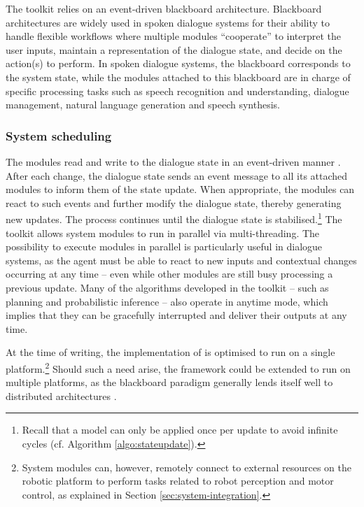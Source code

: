 The \opendial{} toolkit relies on an event-driven blackboard architecture. Blackboard architectures are widely used in spoken dialogue systems for their ability to handle flexible workflows where multiple modules ``cooperate'' to  interpret the user inputs, maintain a representation of the dialogue state, and decide on the action(s) to perform. In spoken dialogue systems, the blackboard corresponds to the system state, while the modules attached to this blackboard are in charge of specific processing tasks such as speech recognition and understanding, dialogue management, natural language generation and speech synthesis. 


\subsubsection*{System scheduling}

The modules read and write to the dialogue state in an event-driven manner . After each change, the dialogue state sends an event message to all its attached modules to inform them of the state update. When appropriate, the modules can react to such events and further modify the dialogue state, thereby generating new updates. The process continues until the dialogue state is stabilised.\footnote{Recall that a model can only be applied once per update to avoid infinite cycles (cf. Algorithm \ref{algo:stateupdate}).}   The \opendial{} toolkit allows system modules to run in parallel via multi-threading. The possibility to execute modules in parallel is particularly useful in dialogue systems, as the agent must be able to react to new inputs and contextual changes occurring at any time -- even while other modules are still busy processing a previous update.  Many of the algorithms developed in the toolkit -- such as planning and probabilistic inference -- also operate in anytime mode, which implies that they can be gracefully interrupted and deliver their outputs at any time.

At the time of writing, the implementation of \opendial{} is optimised to run on a single platform.\footnote{System modules can, however, remotely connect to external resources on the robotic platform to perform tasks related to robot perception and motor control, as explained in Section \ref{sec:system-integration}.} Should such a need arise, the framework could be extended to run on multiple platforms, as the blackboard paradigm generally lends itself well to distributed architectures \citep{Corkill:1989}.

